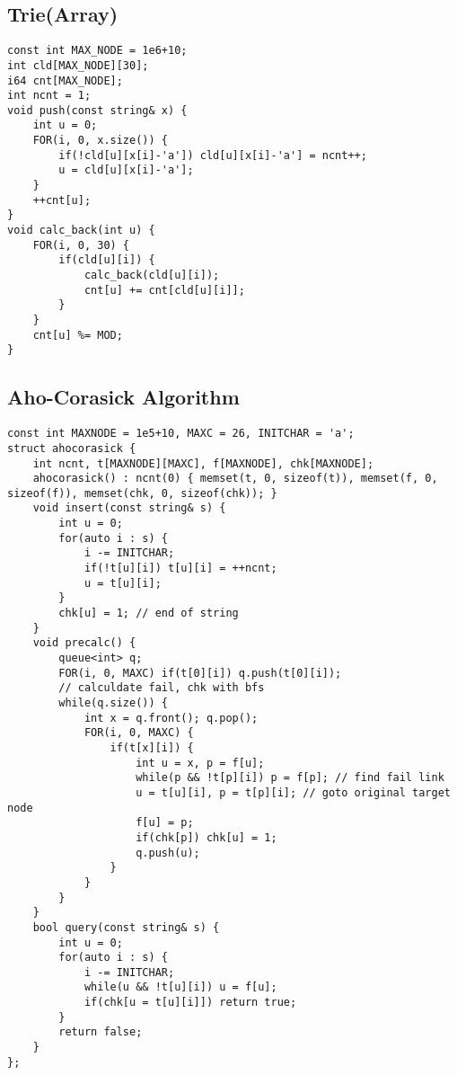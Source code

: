 \documentclass[landscape, 8pt, a4paper, oneside, twocolumn]{extarticle}
\begin{document}
\subsection {Trie(Array)}
\begin{verbatim}
const int MAX_NODE = 1e6+10;
int cld[MAX_NODE][30];
i64 cnt[MAX_NODE];
int ncnt = 1;
void push(const string& x) {
	int u = 0;
	FOR(i, 0, x.size()) {
		if(!cld[u][x[i]-'a']) cld[u][x[i]-'a'] = ncnt++;
		u = cld[u][x[i]-'a'];
	}
	++cnt[u];
}
void calc_back(int u) {
	FOR(i, 0, 30) {
		if(cld[u][i]) {
			calc_back(cld[u][i]);
			cnt[u] += cnt[cld[u][i]];
		}
	}
	cnt[u] %= MOD;
}
\end{verbatim}
\subsection {Aho-Corasick Algorithm}
\begin{verbatim}
const int MAXNODE = 1e5+10, MAXC = 26, INITCHAR = 'a';
struct ahocorasick {
	int ncnt, t[MAXNODE][MAXC], f[MAXNODE], chk[MAXNODE];
	ahocorasick() : ncnt(0) { memset(t, 0, sizeof(t)), memset(f, 0, sizeof(f)), memset(chk, 0, sizeof(chk)); }
	void insert(const string& s) {
		int u = 0;
		for(auto i : s) {
			i -= INITCHAR;
			if(!t[u][i]) t[u][i] = ++ncnt;
			u = t[u][i];
		}
		chk[u] = 1; // end of string
	}
	void precalc() {
		queue<int> q;
		FOR(i, 0, MAXC) if(t[0][i]) q.push(t[0][i]);
		// calculdate fail, chk with bfs
		while(q.size()) {
			int x = q.front(); q.pop();
			FOR(i, 0, MAXC) {
				if(t[x][i]) {
					int u = x, p = f[u];
					while(p && !t[p][i]) p = f[p]; // find fail link
					u = t[u][i], p = t[p][i]; // goto original target node
					f[u] = p;
					if(chk[p]) chk[u] = 1;
					q.push(u);
				}
			}
		}
	}
	bool query(const string& s) {
		int u = 0;
		for(auto i : s) {
			i -= INITCHAR;
			while(u && !t[u][i]) u = f[u];
			if(chk[u = t[u][i]]) return true;
		}
		return false;
	}
};
\end{verbatim}
\end{document}
